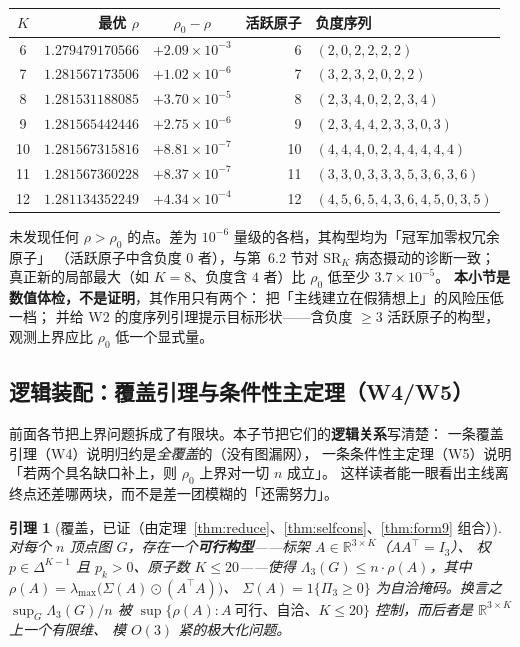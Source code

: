 \documentclass[UTF8,11pt]{ctexart}
\newtheorem{lemma}[theorem]{引理}
\theoremstyle{definition}
\newcommand{\Lam}{\Lambda}
\newcommand{\R}{\mathbb{R}}
\begin{document}
\begin{center}
{\small
\begin{tabular}{@{}crcrl@{}}
\toprule
$K$ & 最优 $\rho$ & $\rho_0-\rho$ & 活跃原子 & 负度序列 \\
\midrule
6  & $1.279479170566$ & $+2.09\times10^{-3}$ & 6  & $(2,0,2,2,2,2)$ \\
7  & $1.281567173506$ & $+1.02\times10^{-6}$ & 7  & $(3,2,3,2,0,2,2)$ \\
8  & $1.281531188085$ & $+3.70\times10^{-5}$ & 8  & $(2,3,4,0,2,2,3,4)$ \\
9  & $1.281565442446$ & $+2.75\times10^{-6}$ & 9  & $(2,3,4,4,2,3,3,0,3)$ \\
10 & $1.281567315816$ & $+8.81\times10^{-7}$ & 10 & $(4,4,4,0,2,4,4,4,4,4)$ \\
11 & $1.281567360228$ & $+8.37\times10^{-7}$ & 11 & $(3,3,0,3,3,3,5,3,6,3,6)$ \\
12 & $1.281134352249$ & $+4.34\times10^{-4}$ & 12 & $(4,5,6,5,4,3,6,4,5,0,3,5)$ \\
\bottomrule
\end{tabular}}
\end{center}

未发现任何 $\rho>\rho_0$ 的点。差为 $10^{-6}$ 量级的各档，其构型均为「冠军加零权冗余原子」
（活跃原子中含负度 $0$ 者），与第~6.2 节对 $\mathrm{SR}_K$ 病态摄动的诊断一致；
真正新的局部最大（如 $K=8$、负度含 $4$ 者）比 $\rho_0$ 低至少 $3.7\times10^{-5}$。
\textbf{本小节是数值体检，不是证明}，其作用只有两个：
把「主线建立在假猜想上」的风险压低一档；
并给 W2 的度序列引理提示目标形状——含负度 $\ge3$ 活跃原子的构型，观测上界应比 $\rho_0$ 低一个显式量。

\subsection{逻辑装配：覆盖引理与条件性主定理（W4/W5）}\label{sec:assemble}

前面各节把上界问题拆成了有限块。本子节把它们的\textbf{逻辑关系}写清楚：
一条覆盖引理（W4）说明归约是\emph{全覆盖}的（没有图漏网），
一条条件性主定理（W5）说明「若两个具名缺口补上，则 $\rho_0$ 上界对一切 $n$ 成立」。
这样读者能一眼看出主线离终点还差哪两块，而不是差一团模糊的「还需努力」。

\begin{lemma}[覆盖，已证（由定理~\ref{thm:reduce}、\ref{thm:selfcons}、\ref{thm:form9} 组合）]\label{lem:cover}
对每个 $n$ 顶点图 $G$，存在一个\textbf{可行构型}——标架 $A\in\R^{3\times K}$（$AA^\top=I_3$）、
权 $p\in\Delta^{K-1}$ 且 $p_k>0$、原子数 $K\le20$——使得
$\Lam_3(G)\le n\cdot\rho(A)$，其中 $\rho(A)=\lambda_{\max}\bigl(\Sigma(A)\odot(A^\top A)\bigr)$、
$\Sigma(A)=1\{\Pi_3\ge0\}$ 为自洽掩码。换言之 $\sup_G\Lam_3(G)/n$ 被
$\sup\{\rho(A):A\ \text{可行、自洽、}K\le20\}$ 控制，而后者是 $\R^{3\times K}$ 上一个有限维、
模 $O(3)$ 紧的极大化问题。
\end{lemma}
\end{document}
